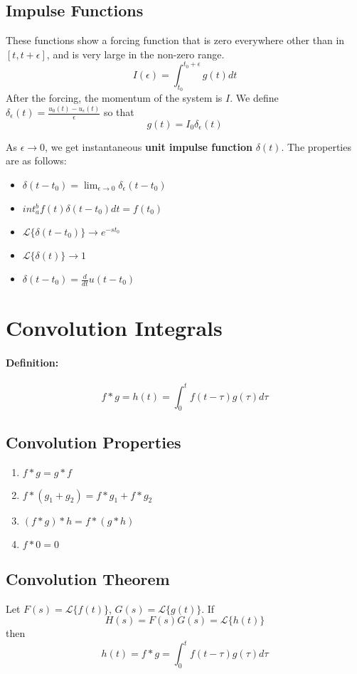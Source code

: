 \documentclass[a4paper,12pt]{report}
\begin{document}
\subsection{Impulse Functions}
These functions show a forcing function that is zero everywhere other than in $[t, t+\epsilon]$, and is very large in the non-zero range. 
$$I(\epsilon) = \int_{t_0}^{t_0+\epsilon} g(t) dt$$
After the forcing, the momentum of the system is $I$. We define $\delta_{\epsilon}(t) = \frac{u_0(t)-u_{\epsilon}(t)}{\epsilon}$ so that 
$$g(t) = I_0\delta_{\epsilon}(t)$$

As $\epsilon \to 0$, we get instantaneous \textbf{unit impulse function} $\delta(t)$. The properties are as follows:
\begin{itemize}
\item $\delta(t-t_0) = \lim_{\epsilon \to 0} \delta_{\epsilon}(t-t_0)$
\item $int_a^b f(t)\delta(t-t_0) dt = f(t_0)$
\item $\mathcal{L}\{\delta(t-t_0)\} \to e^{-st_0}$
\item $\mathcal{L}\{\delta(t)\} \to 1$
\item $\delta(t-t_0) = \frac{d}{dt} u(t-t_0)$
\end{itemize}

\section{Convolution Integrals}
\paragraph{Definition: } $$f * g = h(t) = \int_0^t f(t-\tau)g(\tau)d\tau$$

\subsection{Convolution Properties}
\begin{enumerate}
\item $f*g = g*f$
\item $f*(g_1 + g_2) = f*g_1 + f*g_2$
\item $(f*g)*h = f*(g*h)$
\item $f*0 = 0$
\end{enumerate}

\subsection{Convolution Theorem}
Let $F(s) = \mathcal{L}\{f(t)\}$, $G(s) = \mathcal{L}\{g(t)\}$. If $$H(s) = F(s)G(s) = \mathcal{L}\{h(t)\}$$ 
then $$h(t) = f*g = \int_0^t f(t-\tau)g(\tau) d\tau$$
\end{document}
